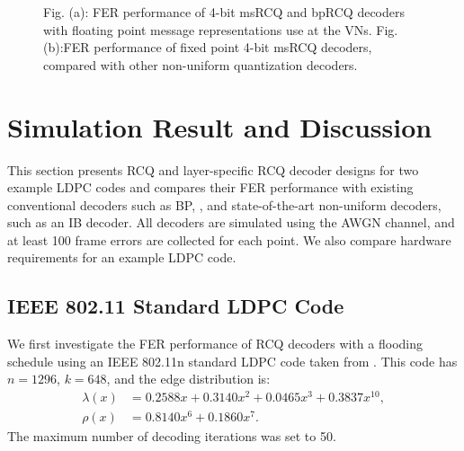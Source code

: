 \documentclass [PhD] {uclathes}
\begin{document}
\begin{figure}[t] 
    \centering
    \hfill
  \caption{Fig. (a): FER performance of 4-bit msRCQ and bpRCQ decoders with floating point message representations use at the VNs.  Fig. (b):FER performance of fixed point 4-bit msRCQ decoders, compared with other non-uniform quantization decoders. }
\end{figure}

\section{Simulation Result and Discussion}\label{sec: simulation result}
This section presents RCQ and layer-specific RCQ decoder designs for two example LDPC codes and compares their FER performance  with existing conventional decoders such as BP, \minsum, and state-of-the-art non-uniform decoders, such as an IB decoder. All decoders are simulated using the AWGN channel, and at least 100 frame errors are collected for each point.  We also compare hardware requirements for an example LDPC code.
\subsection{IEEE 802.11 Standard LDPC Code}
We first investigate the FER performance of RCQ decoders with a flooding schedule using an IEEE 802.11n standard LDPC code taken from \cite{80211spec}. This code has $n=1296$, $k=648$, and the edge distribution is:
\begin{align}
    \lambda(x) &= 0.2588x+0.3140x^2+0.0465x^3+0.3837x^{10}, \\
    \rho(x) &= 0.8140x^6 +0.1860 x^7.
\end{align}
The maximum number of decoding iterations was set to 50.
\end{document}
